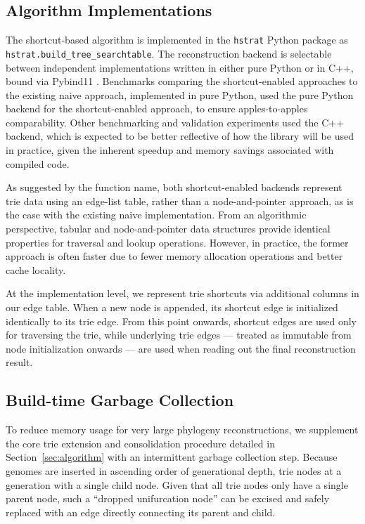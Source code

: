 \subsection{Algorithm Implementations}

The shortcut-based algorithm is implemented in the \texttt{hstrat} Python package \citep{moreno2022hstrat} as \texttt{hstrat.build\_tree\_searchtable}.
The reconstruction backend is selectable between independent implementations written in either pure Python or in C++, bound via Pybind11 \citep{wenzel2017pybind11}.
Benchmarks comparing the shortcut-enabled approaches to the existing naive approach, implemented in pure Python, used the pure Python backend for the shortcut-enabled approach, to ensure apples-to-apples comparability.
Other benchmarking and validation experiments used the C++ backend, which is expected to be better reflective of how the library will be used in practice, given the inherent speedup and memory savings associated with compiled code.

As suggested by the function name, both shortcut-enabled backends represent trie data using an edge-list table, rather than a node-and-pointer approach, as is the case with the existing naive implementation.
From an algorithmic perspective, tabular and node-and-pointer data structures provide identical properties for traversal and lookup operations.
However, in practice, the former approach is often faster due to fewer memory allocation operations and better cache locality.

At the implementation level, we represent trie shortcuts via additional columns in our edge table.
When a new node is appended, its shortcut edge is initialized identically to its trie edge.
From this point onwards, shortcut edges are used only for traversing the trie, while underlying trie edges --- treated as immutable from node initialization onwards --- are used when reading out the final reconstruction result.

\subsection{Build-time Garbage Collection}

To reduce memory usage for very large phylogeny reconstructions, we supplement the core trie extension and consolidation procedure detailed in Section~\ref{sec:algorithm} with an intermittent garbage collection step.
Because genomes are inserted in ascending order of generational depth, trie nodes at a generation with a single child node.
Given that all trie nodes only have a single parent node, such a ``dropped unifurcation node'' can be excised and safely replaced with an edge directly connecting its parent and child.

